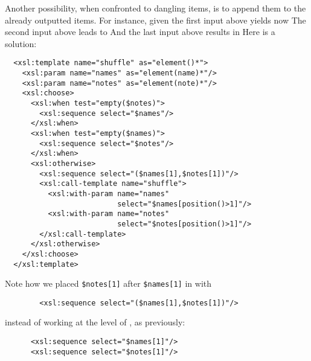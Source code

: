 Another possibility, when confronted to dangling items, is to append
them to the already outputted items. For instance, given the first
input above yields now
\noindent The second input above leads to
\noindent And the last input above results in
\noindent Here is a solution:
\begin{verbatim}
  <xsl:template name="shuffle" as="element()*">
    <xsl:param name="names" as="element(name)*"/>
    <xsl:param name="notes" as="element(note)*"/>
    <xsl:choose>
      <xsl:when test="empty($notes)">
        <xsl:sequence select="$names"/>
      </xsl:when>
      <xsl:when test="empty($names)">
        <xsl:sequence select="$notes"/>
      </xsl:when>
      <xsl:otherwise>
        <xsl:sequence select="($names[1],$notes[1])"/>
        <xsl:call-template name="shuffle">
          <xsl:with-param name="names"
                          select="$names[position()>1]"/>
          <xsl:with-param name="notes"
                          select="$notes[position()>1]"/>
        </xsl:call-template>
      </xsl:otherwise>
    </xsl:choose>
  </xsl:template>
\end{verbatim}
Note how we placed \texttt{\$notes[1]} after \texttt{\$names[1]} in
\XPath with
\begin{verbatim}
        <xsl:sequence select="($names[1],$notes[1])"/>
\end{verbatim}
instead of working at the level of \XSLT, as previously:
\begin{verbatim}
      <xsl:sequence select="$names[1]"/>
      <xsl:sequence select="$notes[1]"/>
\end{verbatim}

